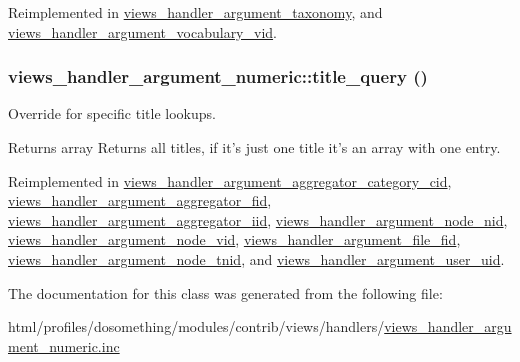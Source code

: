 Reimplemented in \hyperlink{classviews__handler__argument__taxonomy_a330517e71ccc84fe85e871e05640c36d}{views\_\-handler\_\-argument\_\-taxonomy}, and \hyperlink{classviews__handler__argument__vocabulary__vid_af932cd38cbab2252261bcb077f2d9bd7}{views\_\-handler\_\-argument\_\-vocabulary\_\-vid}.\hypertarget{classviews__handler__argument__numeric_a5c6f566b06bad6057e92f15d82311c7b}{
\subsubsection[{title\_\-query}]{\setlength{\rightskip}{0pt plus 5cm}views\_\-handler\_\-argument\_\-numeric::title\_\-query ()}}
\label{classviews__handler__argument__numeric_a5c6f566b06bad6057e92f15d82311c7b}
Override for specific title lookups. \begin{DoxyReturn}{Returns}
array Returns all titles, if it's just one title it's an array with one entry. 
\end{DoxyReturn}


Reimplemented in \hyperlink{classviews__handler__argument__aggregator__category__cid_aaaf79328b4ec709281563e275f9a7df2}{views\_\-handler\_\-argument\_\-aggregator\_\-category\_\-cid}, \hyperlink{classviews__handler__argument__aggregator__fid_a4d5f8aef22b4b3431c92fe2a496d9789}{views\_\-handler\_\-argument\_\-aggregator\_\-fid}, \hyperlink{classviews__handler__argument__aggregator__iid_aeae3f76b2f4a4355f556cef9effa109d}{views\_\-handler\_\-argument\_\-aggregator\_\-iid}, \hyperlink{classviews__handler__argument__node__nid_a7c448ef89d94d7b103a162128ee9bbf8}{views\_\-handler\_\-argument\_\-node\_\-nid}, \hyperlink{classviews__handler__argument__node__vid_a174a060cd5fb97db7991708db67e8724}{views\_\-handler\_\-argument\_\-node\_\-vid}, \hyperlink{classviews__handler__argument__file__fid_af5b40f038d917835dfc95c22b2d7c0ee}{views\_\-handler\_\-argument\_\-file\_\-fid}, \hyperlink{classviews__handler__argument__node__tnid_a4b22c61185c2c55b8fbfe40b4e131d69}{views\_\-handler\_\-argument\_\-node\_\-tnid}, and \hyperlink{classviews__handler__argument__user__uid_a9ab9aa6bd71e9a2fa2a2c82a88f9dbff}{views\_\-handler\_\-argument\_\-user\_\-uid}.

The documentation for this class was generated from the following file:\begin{DoxyCompactItemize}
\item 
html/profiles/dosomething/modules/contrib/views/handlers/\hyperlink{views__handler__argument__numeric_8inc}{views\_\-handler\_\-argument\_\-numeric.inc}\end{DoxyCompactItemize}

